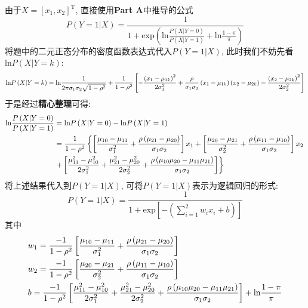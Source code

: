 \documentclass{article}
\begin{document}
\begin{homeworkProblem}
	\solution 由于$X=[x_1,x_2]^{\text{T}}$, 直接使用\textbf{Part A}中推导的公式$$P\left( Y=1|X \right) =\frac{1}{1+\text{exp} \left( \displaystyle \text{ln} \frac{P\left( X|Y=0 \right)}{P\left( X|Y=1 \right)}+\text{ln} \frac{1-\pi}{\pi} \right)}
	$$
	将题中的二元正态分布的密度函数表达式代入$P(Y=1|X)$, 此时我们不妨先看$\text{ln} P\left( X|Y=k \right) $:
	\begin{align}
		\text{ln} P\left( X|Y=k \right) =\text{ln} \frac{1}{2\pi \sigma _1\sigma _2\sqrt{1-\rho ^2}}+\frac{1}{1-\rho ^2}\left[ -\frac{\left( x_1-\mu _{1k} \right) ^2}{2\sigma _{1}^{2}}+\frac{\rho}{\sigma _1\sigma _2}\left( x_1-\mu _{1k} \right) \left( x_2-\mu _{2k} \right) -\frac{\left( x_2-\mu _{2k} \right) ^2}{2\sigma _{2}^{2}} \right]  \notag
	\end{align}
	于是经过\textbf{精心整理}可得:
	\begin{align}
		\text{ln} \frac{P\left( X|Y=0 \right)}{P\left( X|Y=1 \right)}&=\text{ln} P\left( X|Y=0 \right) -\text{ln} P\left( X|Y=1 \right)  \notag
		\\
		&=\frac{1}{1-\rho ^2}\left\{ \left[ \frac{\mu _{10}-\mu _{11}}{\sigma _{1}^{2}}+\frac{\rho \left( \mu _{21}-\mu _{20} \right)}{\sigma _1\sigma _2} \right] x_1+\left[ \frac{\mu _{20}-\mu _{21}}{\sigma _{2}^{2}}+\frac{\rho \left( \mu _{11}-\mu _{10} \right)}{\sigma _1\sigma _2} \right] x_2 \right.  \notag
		\\
		&\left. +\left[ \frac{\mu _{11}^{2}-\mu _{10}^{2}}{2\sigma _{1}^{2}}+\frac{\mu _{21}^{2}-\mu _{20}^{2}}{2\sigma _{2}^{2}}+\frac{\rho \left( \mu _{10}\mu _{20}-\mu _{11}\mu _{21} \right)}{\sigma _1\sigma _2} \right] \right\}  \notag
	\end{align}
	将上述结果代入到$P(Y=1|X)$, 可将$P(Y=1|X)$表示为逻辑回归的形式:
	$$
	P\left( Y=1|X \right) =\frac{1}{1+\text{exp} \left[ -\left( \displaystyle \sum_{i=1}^2{w_ix_i}+b \right) \right]}
	$$
	其中
	\begin{align}
		&w_1=\frac{-1}{1-\rho ^2}\left[ \frac{\mu _{10}-\mu _{11}}{\sigma _{1}^{2}}+\frac{\rho \left( \mu _{21}-\mu _{20} \right)}{\sigma _1\sigma _2} \right]  \notag
		\\
		&w_2=\frac{-1}{1-\rho ^2}\left[ \frac{\mu _{20}-\mu _{21}}{\sigma _{2}^{2}}+\frac{\rho \left( \mu _{11}-\mu _{10} \right)}{\sigma _1\sigma _2} \right] \notag
		\\
		&b=\frac{-1}{1-\rho ^2}\left[ \frac{\mu _{11}^{2}-\mu _{10}^{2}}{2\sigma _{1}^{2}}+\frac{\mu _{21}^{2}-\mu _{20}^{2}}{2\sigma _{2}^{2}}+\frac{\rho \left( \mu _{10}\mu _{20}-\mu _{11}\mu _{21} \right)}{\sigma _1\sigma _2} \right] +\text{ln} \frac{1-\pi}{\pi} \notag

\end{align}
\end{homeworkProblem}
\end{document}
